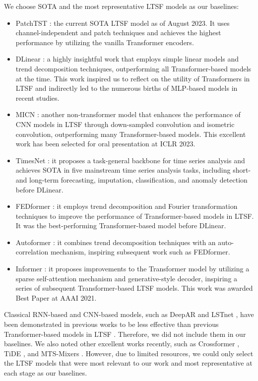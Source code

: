\documentclass{article} \usepackage{iclr2024_conference,times}
\begin{document}
We choose SOTA and the most representative LTSF models as our baselines:
\begin{itemize}
    \item PatchTST \citep{patchtst}: the current SOTA LTSF model as of August 2023. It uses channel-independent and patch techniques and achieves the highest performance by utilizing the vanilla Transformer encoders.
\item DLinear \citep{dlinear}: a highly insightful work that employs simple linear models and trend decomposition techniques, outperforming all Transformer-based models at the time. This work inspired us to reflect on the utility of Transformers in LTSF and indirectly led to the numerous births of MLP-based models in recent studies. 
    \item MICN \citep{micn}: another non-transformer model that enhances the performance of CNN models in LTSF through down-sampled convolution and isometric convolution, outperforming many Transformer-based models. This excellent work has been selected for oral presentation at ICLR 2023.
    
    \item TimesNet \citep{timesnet}: it proposes a task-general backbone for time series analysis and achieves SOTA in five mainstream time series analysis tasks, including short- and long-term forecasting, imputation, classification, and anomaly detection before DLinear. 

    \item FEDformer \citep{fedformer}: it employs trend decomposition and Fourier transformation techniques to improve the performance of Transformer-based models in LTSF. It was the best-performing Transformer-based model before DLinear.
    \item Autoformer \citep{autoformer}: it combines trend decomposition techniques with an auto-correlation mechanism, inspiring subsequent work such as FEDformer.
    \item Informer \citep{informer}: it proposes improvements to the Transformer model by utilizing a sparse self-attention mechanism and generative-style decoder, inspiring a series of subsequent Transformer-based LTSF models. This work was awarded Best Paper at AAAI 2021.
\end{itemize}

Classical RNN-based and CNN-based models, such as DeepAR \citep{deepar} and LSTnet \citep{lstnet}, have been demonstrated in previous works to be less effective than previous Transformer-based models in LTSF \citep{informer, autoformer}. Therefore, we did not include them in our baselines. We also noted other excellent works recently, such as Crossformer \citep{crossformer}, TiDE \citep{tide}, and MTS-Mixers \citep{mtsmixer}. However, due to limited resources, we could only select the LTSF models that were most relevant to our work and most representative at each stage as our baselines.
\end{document}

